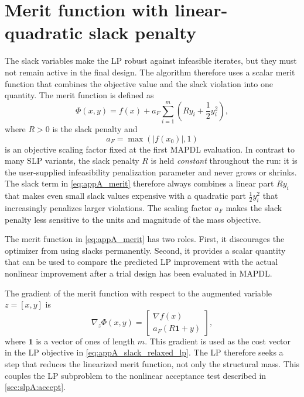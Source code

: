 \section{Merit function with linear-quadratic slack penalty}
\label{sec:slpA:merit}

The slack variables make the LP robust against infeasible iterates,
but they must not remain active in the final design. The algorithm
therefore uses a scalar merit function that combines the objective
value and the slack violation into one quantity. The merit function
is defined as
\begin{equation}
\label{eq:appA_merit}
    \Phi(x,y)
    =
    f(x)
    +
    a_F
    \sum_{i=1}^{m}
    \left(
        R y_i
        +
        \frac{1}{2}y_i^2
    \right),
\end{equation}
where $R > 0$ is the slack penalty and
\begin{equation}
\label{eq:appA_af}
    a_F = \max\left(|f(x_0)|,1\right)
\end{equation}
is an objective scaling factor fixed at the first MAPDL evaluation.
In contrast to many SLP variants, the slack penalty $R$ is held
\emph{constant} throughout the run: it is the user-supplied
infeasibility penalization parameter and never grows or shrinks. The
slack term in \autoref{eq:appA_merit} therefore always combines a
linear part $R y_i$ that makes even small slack values expensive with
a quadratic part $\tfrac{1}{2}y_i^2$ that increasingly penalizes
larger violations. The scaling factor $a_F$ makes the slack penalty
less sensitive to the units and magnitude of the mass objective.

The merit function in \autoref{eq:appA_merit} has two roles. First,
it discourages the optimizer from using slacks permanently. Second,
it provides a scalar quantity that can be used to compare the
predicted LP improvement with the actual nonlinear improvement after
a trial design has been evaluated in MAPDL.

The gradient of the merit function with respect to the augmented
variable $z=[x,y]$ is
\begin{equation}
\label{eq:appA_merit_grad}
    \nabla_z \Phi(x,y)
    =
    \begin{bmatrix}
        \nabla f(x)
        \\
        a_F(R\mathbf{1}+y)
    \end{bmatrix},
\end{equation}
where $\mathbf{1}$ is a vector of ones of length $m$. This gradient is
used as the cost vector in the LP objective in
\autoref{eq:appA_slack_relaxed_lp}. The LP therefore seeks a step that
reduces the linearized merit function, not only the structural mass.
This couples the LP subproblem to the nonlinear acceptance test
described in \autoref{sec:slpA:accept}.

